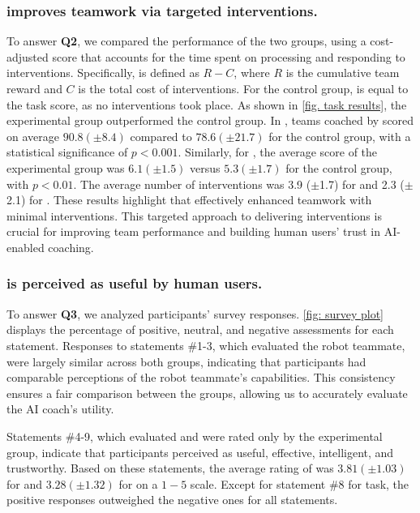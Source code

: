 \subsubsection{\coach improves teamwork via targeted interventions.}
To answer \textbf{Q2}, we compared the performance of the two groups, using a cost-adjusted score that accounts for the time spent on processing and responding to interventions. Specifically, \score is defined as $R - C$, where $R$ is the cumulative team reward and $C$ is the total cost of interventions. For the control group, \score is equal to the task score, as no interventions took place.
As shown in \cref{fig. task results}, the experimental group outperformed the control group. In \movers, teams coached by \coach scored on average $90.8 (\pm 8.4)$ compared to $78.6 (\pm 21.7)$ for the control group, with a statistical significance of $p < 0.001$. Similarly, for \rescue, the average score of the experimental group was $6.1 (\pm 1.5)$ versus $5.3 (\pm 1.7)$ for the control group, with $p < 0.01$. The average number of interventions was 3.9 ($\pm$1.7) for \movers and 2.3 ($\pm$2.1) for \rescue. These results highlight that \coach effectively enhanced teamwork with minimal interventions. This targeted approach to delivering interventions is crucial for improving team performance and building human users' trust in AI-enabled coaching.

\subsubsection{\coach is perceived as useful by human users.}
\label{sec: survey results}
To answer \textbf{Q3}, we analyzed participants' survey responses. \cref{fig: survey plot} displays the percentage of positive, neutral, and negative assessments for each statement. 
Responses to statements \#1-3, which evaluated the robot teammate, were largely similar across both groups, indicating that participants had comparable perceptions of the robot teammate's capabilities. This consistency ensures a fair comparison between the groups, allowing us to accurately evaluate the AI coach's utility.

Statements \#4-9, which evaluated \coach and were rated only by the experimental group, indicate that participants perceived \coach as useful, effective, intelligent, and trustworthy.
Based on these statements, the average rating of \coach was $3.81 (\pm 1.03)$ for \movers and $3.28 (\pm 1.32)$ for \rescue on a $1-5$ scale.
Except for statement \#8 for \rescue task, the positive responses outweighed the negative ones for all statements.

